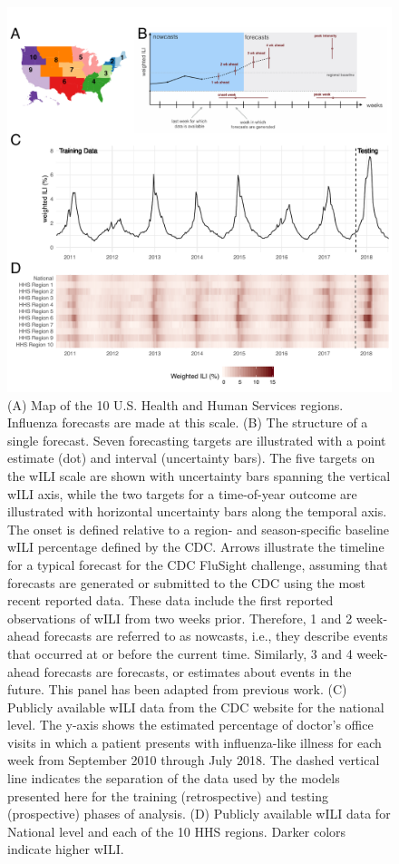 \documentclass{article}\usepackage[]{graphicx}\usepackage[]{color}
\begin{document}
\begin{figure}[htbp]
\begin{center}
\includegraphics[width=\textwidth]{static-content/overview-figure-edited.pdf}
\caption{(A) Map of the 10 U.S. Health and Human Services regions. Influenza forecasts are made at this scale. (B) The structure of a single forecast. Seven forecasting targets are illustrated with a point estimate (dot) and interval (uncertainty bars). The five targets on the wILI scale are shown with uncertainty bars spanning the vertical wILI axis, while the two targets for a time-of-year outcome are illustrated with horizontal uncertainty bars along the temporal axis. The onset is defined relative to a region- and season-specific baseline wILI percentage defined by the CDC.\cite{biggerstaff2018systematic} Arrows illustrate the timeline for a typical forecast for the CDC FluSight challenge, assuming that forecasts are generated or submitted to the CDC using the most recent reported data. These data include the first reported observations of wILI from two weeks prior. Therefore, 1 and 2 week-ahead forecasts are referred to as nowcasts, i.e., they describe events that occurred at or before the current time. Similarly, 3 and 4 week-ahead forecasts are forecasts, or estimates about events in the future. This panel has been adapted from previous work.\cite{Reich2018} (C) Publicly available wILI data from the CDC website for the national level. The y-axis shows the estimated percentage of doctor's office visits in which a patient presents with influenza-like illness for each week from September 2010 through July 2018. The dashed vertical line indicates the separation of the data used by the models presented here for the training (retrospective) and testing (prospective) phases of analysis. (D) Publicly available wILI data for National level and each of the 10 HHS regions. Darker colors indicate higher wILI.}
\label{fig:overview-schematic}
\end{center}
\end{figure}
\end{document}
